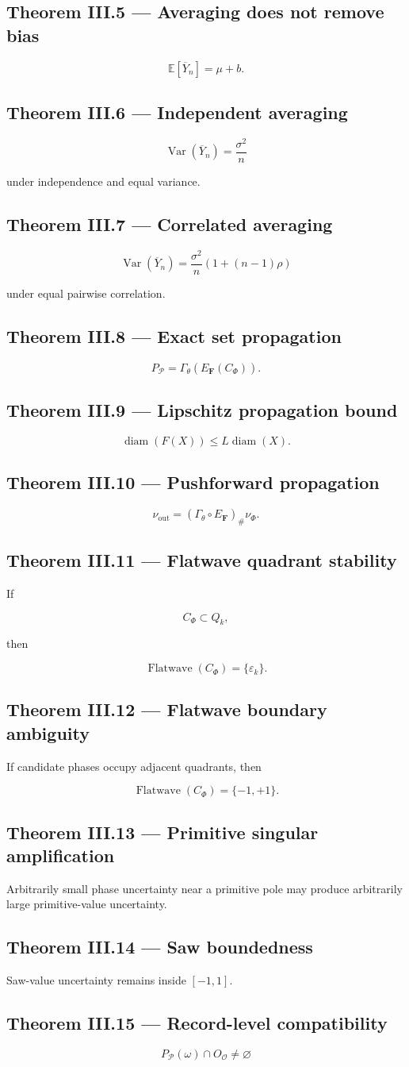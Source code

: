 \documentclass[11pt,oneside,openany]{book}
\newcommand{\PCsubsection}[1]{%
  \subsection*{#1}%
}
\begin{document}
\PCsubsection{Theorem III.5 --- Averaging does not remove bias}

\[
\mathbb E[\overline Y_n]=\mu+b.
\]

\PCsubsection{Theorem III.6 --- Independent averaging}

\[
\operatorname{Var}(\overline Y_n) = \frac{\sigma^2}{n}
\]

under independence and equal variance.

\PCsubsection{Theorem III.7 --- Correlated averaging}

\[
\operatorname{Var}(\overline Y_n) = \frac{\sigma^2}{n} \left( 1+(n-1)\rho \right)
\]

under equal pairwise correlation.

\PCsubsection{Theorem III.8 --- Exact set propagation}

\[
P_{\mathcal P} = \Gamma_\theta \left( E_{\mathbf F}(C_\Phi) \right).
\]

\PCsubsection{Theorem III.9 --- Lipschitz propagation bound}

\[
\operatorname{diam}(F(X)) \leq L\operatorname{diam}(X).
\]

\PCsubsection{Theorem III.10 --- Pushforward propagation}

\[
\nu_{\mathrm{out}} = (\Gamma_\theta\circ E_{\mathbf F})_{\#}\nu_\Phi.
\]

\PCsubsection{Theorem III.11 --- Flatwave quadrant stability}

If

\[
C_\Phi\subset Q_k,
\]

then

\[
\operatorname{Flatwave}(C_\Phi)=\{\varepsilon_k\}.
\]

\PCsubsection{Theorem III.12 --- Flatwave boundary ambiguity}

If candidate phases occupy adjacent quadrants, then

\[
\operatorname{Flatwave}(C_\Phi)=\{-1,+1\}.
\]

\PCsubsection{Theorem III.13 --- Primitive singular amplification}

Arbitrarily small phase uncertainty near a primitive pole may produce arbitrarily large primitive-value uncertainty.

\PCsubsection{Theorem III.14 --- Saw boundedness}

Saw-value uncertainty remains inside \([-1,1]\).

\PCsubsection{Theorem III.15 --- Record-level compatibility}

\[
P_{\mathcal P}(\omega) \cap O_{\mathcal O} \neq\varnothing
\]
\end{document}
